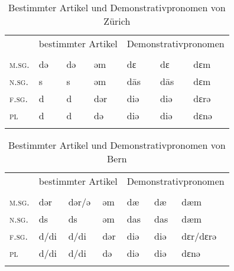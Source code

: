 \begin{table}[H]
	\caption{Bestimmter Artikel und Demonstrativpronomen von Zürich \citep[101-104, 139-140]{Weber1987}}\label{table90}
	\begin{tabular}{lllllll}
		\lsptoprule
		& \multicolumn{3}{c}{bestimmter Artikel} & \multicolumn{3}{c}{Demonstrativpronomen} \\\cmidrule(lr){2-4}\cmidrule(lr){5-7}		
		& \NOM & \AKK & \DAT & \NOM & \AKK & \DAT\\\midrule
		\textsc{m.sg.} & də & də & əm & dɛ & dɛ & dɛm\\
		\textsc{n.sg.} & s & s & əm & d\=as & d\=as & dɛm\\
		\textsc{f.sg.} & d & d & dər & diə & diə & dɛrə\\
		\textsc{pl} & d & d & də & diə & diə & dɛnə\\
		\lspbottomrule
	\end{tabular}
\end{table}


\begin{table}[H]
	\caption{Bestimmter Artikel und Demonstrativpronomen von Bern \citep[77-79, 102-103]{Marti1985}}\label{table91}
	\begin{tabular}{lllllll}
		\lsptoprule
		& \multicolumn{3}{c}{bestimmter Artikel} & \multicolumn{3}{c}{Demonstrativpronomen} \\\cmidrule(lr){2-4}\cmidrule(lr){5-7}		
		& \NOM & \AKK & \DAT & \NOM & \AKK & \DAT\\\midrule
		\textsc{m.sg.} & dər & dər/ə & əm & dæ & dæ & dæm\\
		\textsc{n.sg.} & ds & ds & əm & das & das & dæm\\
		\textsc{f.sg.} & d/di & d/di & dər & diə & diə & dɛr/dɛrə\\
		\textsc{pl} & d/di & d/di & də & diə & diə & dɛnə\\
		\lspbottomrule
	\end{tabular}
\end{table}


